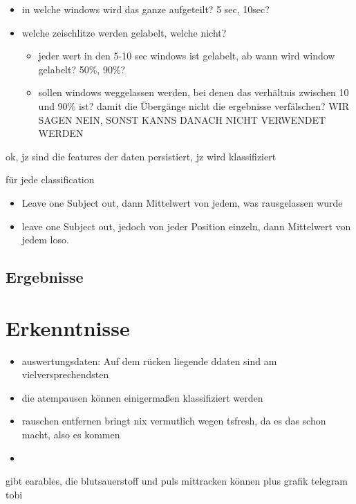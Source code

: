 \begin{itemize}
    \item in welche windows wird das ganze aufgeteilt? 5 sec, 10sec?
    \item welche zeischlitze werden gelabelt, welche nicht?
    \begin{itemize}
        \item jeder wert in den 5-10 sec windows ist gelabelt, ab wann wird window gelabelt? 50\%, 90\%?
        \item sollen windows weggelassen werden, bei denen das verhältnis zwischen 10 und 90\% ist? damit die Übergänge nicht die ergebnisse verfälschen? WIR SAGEN NEIN, SONST KANNS DANACH NICHT VERWENDET WERDEN
    \end{itemize}
\end{itemize}
ok, jz sind die features der daten persistiert, jz wird klassifiziert

für jede classification
\begin{itemize}
    \item Leave one Subject out, dann Mittelwert von jedem, was rausgelassen wurde
    \item leave one Subject out, jedoch von jeder Position einzeln, dann Mittelwert von jedem loso.
\end{itemize}

\subsection{Ergebnisse}

\section{Erkenntnisse}
\begin{itemize}
    \item auswertungsdaten: Auf dem rücken liegende ddaten sind am vielversprechendsten
    \item die atempausen können einigermaßen klassifiziert werden
    \item rauschen entfernen bringt nix vermutlich wegen tsfresh, da es das schon macht, also es kommen
    \item 
\end{itemize}


gibt earables, die blutsauerstoff und puls mittracken können
plus grafik telegram tobi